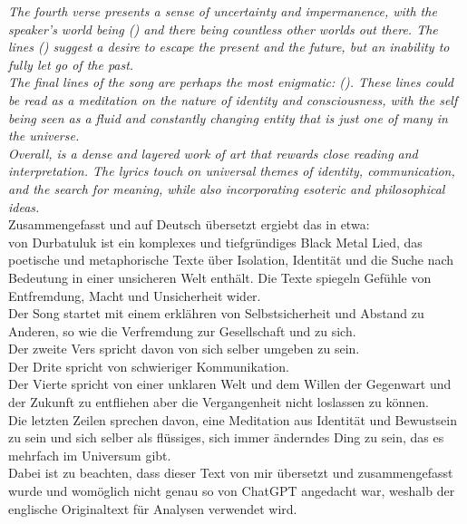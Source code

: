 \documentclass[twocolumn,10pt]{article}
\begin{document}
			\textit{The fourth verse presents a sense of uncertainty and impermanence, with the speaker's world being  () and there being countless other worlds out there. The lines  () suggest a desire to escape the present and the future, but an inability to fully let go of the past.}\vspace{11pt}\\
			\textit{The final lines of the song are perhaps the most enigmatic:  (). These lines could be read as a meditation on the nature of identity and consciousness, with the self being seen as a fluid and constantly changing entity that is just one of many in the universe.}\vspace{11pt}\\
			\textit{Overall,  is a dense and layered work of art that rewards close reading and interpretation. The lyrics touch on universal themes of identity, communication, and the search for meaning, while also incorporating esoteric and philosophical ideas.}\vspace{11pt}\\
			Zusammengefasst und auf Deutsch übersetzt ergiebt das in etwa:\\
			 von Durbatuluk ist ein komplexes und tiefgründiges Black Metal Lied, das poetische und metaphorische Texte über Isolation, Identität und die Suche nach Bedeutung in einer unsicheren Welt enthält. Die Texte spiegeln Gefühle von Entfremdung, Macht und Unsicherheit wider.\\
			Der Song startet mit einem erklähren von Selbstsicherheit und Abstand zu Anderen, so wie die Verfremdung zur Gesellschaft und zu sich.\\
			Der zweite Vers spricht davon von sich selber umgeben zu sein.\\
			Der Drite spricht von schwieriger Kommunikation.\\
			Der Vierte spricht von einer unklaren Welt und dem Willen der Gegenwart und der Zukunft zu entfliehen aber die Vergangenheit nicht loslassen zu können.\\
			Die letzten Zeilen sprechen davon, eine Meditation aus Identität und Bewustsein zu sein und sich selber als flüssiges, sich immer änderndes Ding zu sein, das es mehrfach im Universum gibt.\\
			Dabei ist zu beachten, dass dieser Text von mir übersetzt und zusammengefasst wurde und womöglich nicht genau so von ChatGPT\cite{ChatGPT} angedacht war, weshalb der englische Originaltext für Analysen verwendet wird.
			\pagebreak
\end{document}
